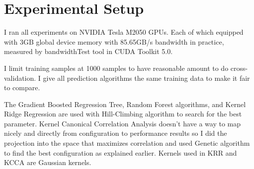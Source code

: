 \section{Experimental Setup}
I ran all experiments on NVIDIA Tesla M2050 GPUs. Each of which equipped with 3GB global device memory with 85.65GB/s bandwidth in practice, measured by bandwidthTest tool in CUDA Toolkit 5.0.

I limit training samples at 1000 samples to have reasonable amount to do cross-validation. I give all prediction algorithms the same training data to make it fair to compare.

The Gradient Boosted Regression Tree, Random Forest algorithms, and Kernel Ridge Regression are used with Hill-Climbing algorithm to search for the best parameter. Kernel Canonical Correlation Analysis doesn't have a way to map nicely and directly from configuration to performance results so I did the projection into the space that maximizes correlation and used Genetic algorithm to find the best configuration as explained earlier. Kernels used in KRR and KCCA are Gaussian kernels.
